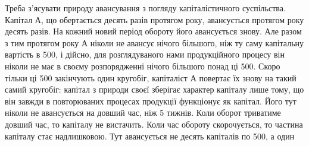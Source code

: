 Треба з’ясувати природу авансування з погляду капіталістичного суспільства.
Капітал $А$, що обертається десять разів протягом року, авансується
протягом року десять разів. На кожний новий період обороту його авансується
знову. Але разом з тим протягом року $А$ ніколи не авансує нічого
більшого, ніж ту саму капітальну вартість в 500, і дійсно,
для розглядуваного нами продукційного процесу він ніколи не має в
своєму розпорядженні нічого більшого понад ці 500. Скоро тільки
ці 500 закінчують один кругобіг, капіталіст $А$ повертає їх
знову на такий самий кругобіг: капітал з природи своєї зберігає характер
капіталу лише тому, що він завжди в повторюваних процесах продукції
функціонує як капітал. Його тут ніколи не авансується на довший час,
ніж 5 тижнів. Коли оборот триватиме довший час, то капіталу не вистачить.
Коли час обороту скорочується, то частина капіталу стає надлишковою.
Тут авансується не десять капіталів по 500, а один
\parbreak{}  %
